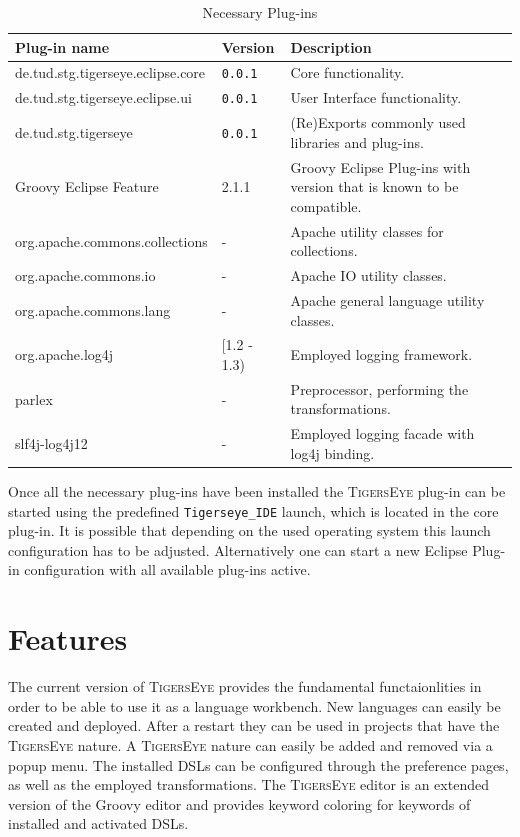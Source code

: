 \documentclass[article,colorback,accentcolor=tud4c]{tudreport}
\newcommand\tiger{%
  \textsc{TigersEye}
}
\newcommand\versionnum{%
  \texttt{0.0.1}
}
\begin{document}
	
	\begin{table}
	\centering
	  \begin{tabular}{|l|l|p{}|}
		\hline
		Plug-in name & Version & Description\\ \hline	
		de.tud.stg.tigerseye.eclipse.core & \versionnum & Core functionality.\\
		de.tud.stg.tigerseye.eclipse.ui& \versionnum & User Interface functionality.\\
		de.tud.stg.tigerseye & \versionnum & (Re)Exports commonly used libraries and plug-ins.\\
		Groovy Eclipse Feature & 2.1.1 & Groovy Eclipse Plug-ins with version that is known to be compatible.\\
		org.apache.commons.collections & - & Apache utility classes for collections.\\
		org.apache.commons.io & - & Apache IO utility classes.\\
		org.apache.commons.lang& - & Apache general language utility classes.\\
		org.apache.log4j & [1.2 - 1.3) & Employed logging framework.\\
		parlex & - & Preprocessor, performing the transformations. \\
		slf4j-log4j12 & - & Employed logging facade with log4j binding.\\
		\hline
	  \end{tabular}
	  \caption{Necessary Plug-ins}\label{lst:dependencies}\label{lst:dependencies}
	\end{table}
	

	Once all the necessary plug-ins have been installed the \tiger plug-in can be started using the predefined \texttt{Tigerseye\_IDE} launch, which is located in the core plug-in. 
	It is possible that depending on the used operating system this launch configuration has to be adjusted. Alternatively one can start a new Eclipse Plug-in configuration with all available plug-ins active.
	

  \section{Features}

	The current version of \tiger provides the fundamental functaionlities in order to be able to use it as a language workbench. New languages can easily be created and deployed. After a restart they can be used in projects that have the \tiger nature. A \tiger nature can easily be added and removed via a popup menu. The installed DSLs can be configured through the preference pages, as well as the employed transformations. The \tiger editor is an extended version of the Groovy editor and provides keyword coloring for keywords of installed and activated DSLs.
	
\end{document}
